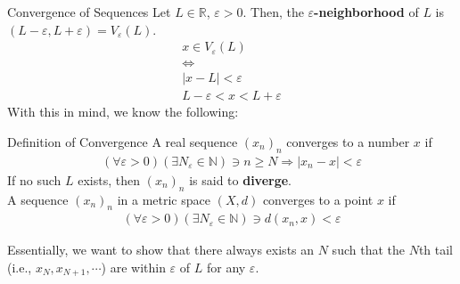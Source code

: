 \documentclass[10pt]{extarticle}
\newcommand{\N}{\mathbb{N}}
\newcommand{\R}{\mathbb{R}}
\begin{document}
  \begin{problem}{Convergence of Sequences}
    Let $L\in\R$, $\varepsilon > 0$. Then, the $\varepsilon$\textbf{-neighborhood} of $L$ is $(L-\varepsilon, L+\varepsilon) = V_{\varepsilon}(L)$.
    \begin{align*}
      x\in V_{\varepsilon}(L)\\
      \Leftrightarrow\\
      |x-L| < \varepsilon\\
      L-\varepsilon < x < L+\varepsilon
    \end{align*}
    With this in mind, we know the following:
    \begin{problem}{Definition of Convergence}
      A real sequence $(x_n)_n$ converges to a number $x$ if 
      \begin{align*}
        \left(\forall \varepsilon > 0\right)\left(\exists N_{\varepsilon}\in\N\right) \ni n\geq N \Rightarrow |x_n-x| < \varepsilon
      \end{align*}
      If no such $L$ exists, then $(x_n)_n$ is said to \textbf{diverge}.\\

      A sequence $(x_n)_n$ in a metric space $(X,d)$ converges to a point $x$ if
      \begin{align*}
        \left(\forall \varepsilon > 0\right)\left(\exists N_{\varepsilon}\in\N\right) \ni d(x_n,x) < \varepsilon
      \end{align*}
    \end{problem}
    Essentially, we want to show that there always exists an $N$ such that the $N$th tail (i.e., $x_{N}, x_{N+1},\cdots$) are within $\varepsilon$ of $L$ for any $\varepsilon$.\\


\end{problem}
\end{document}
